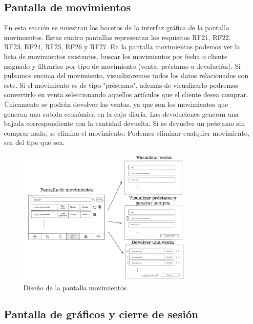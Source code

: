 \newpage


\subsection{Pantalla de movimientos}

En esta sección se muestran los bocetos de la interfaz gráfica de la pantalla movimientos. Estas cuatro pantallas representan los requisitos RF21, RF22, RF23, RF24, RF25, RF26 y RF27. En la pantalla movimientos podemos ver la lista de movimientos existentes, buscar los movimientos por fecha o cliente asignado y filtrarlos por tipo de movimiento (venta, préstamo o devolución). Si pulsamos encima del movimiento, visualizaremos todos los datos relacionados con este. Si el movimiento es de tipo "préstamo", además de visualizarlo podremos convertirlo en venta seleccionando aquellos artículos que el cliente desea comprar. Únicamente se podrán devolver las ventas, ya que son los movimientos que generan una subida económica en la caja diaria. Las devoluciones generan una bajada correspondiente con la cantidad devuelta. Si se devuelve un préstamo sin comprar nada, se elimina el movimiento. Podemos eliminar cualquier movimiento, sea del tipo que sea. 


\begin{figure}[ht]
	\centering
	\includegraphics[width=0.8\textwidth, angle=270]{imagenes/pantalla_movimientos.JPG}
	\caption{Diseño de la pantalla movimientos.}
	\label{fig:pantallamovimientos}
\end{figure}

\newpage

\subsection{Pantalla de gráficos y cierre de sesión}

